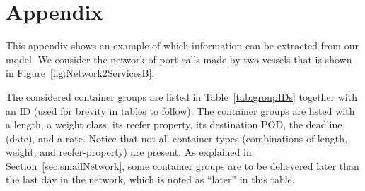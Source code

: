 \appendix
\section{Appendix}
This appendix shows an example of which information can be extracted from our model. 
We consider the network of port calls made by two vessels that is shown in Figure~\ref{fig:Network2ServicesB}. 
  
The considered container groups are listed in Table~\ref{tab:groupIDs} together with an ID (used for brevity in tables to follow). The container groups are listed with a length, a weight class, its reefer property, its destination POD, the deadline (date), and a rate. Notice that not all container types (combinations of length, weight, and reefer-property) are present. As explained in Section~\ref{sec:smallNetwork}, some container groups are to be delievered later than the last day in the network, which is noted as ``later'' in this table. 

